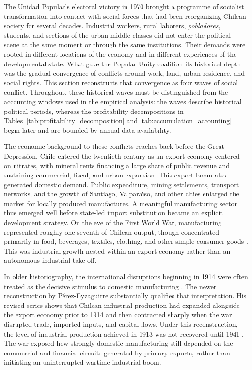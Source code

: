 The Unidad Popular's electoral victory in 1970 brought a programme of socialist transformation into contact with social forces that had been reorganizing Chilean society for several decades. Industrial workers, rural laborers, \emph{pobladores}, students, and sections of the urban middle classes did not enter the political scene at the same moment or through the same institutions. Their demands were rooted in different locations of the economy and in different experiences of the developmental state. What gave the Popular Unity coalition its historical depth was the gradual convergence of conflicts around work, land, urban residence, and social rights. This section reconstructs that convergence as four waves of social conflict. Throughout, these historical waves must be distinguished from the accounting windows used in the empirical analysis: the waves describe historical political periods, whereas the profitability decompositions in Tables~\ref{tab:profitability_decomposition} and \ref{tab:accumulation_accounting} begin later and are bounded by annual data availability.

The economic background to these conflicts reaches back before the Great Depression. Chile entered the twentieth century as an export economy centered on nitrates, with mineral rents financing a large share of public revenue and sustaining commercial, fiscal, and urban expansion. This export boom also generated domestic demand. Public expenditure, mining settlements, transport networks, and the growth of Santiago, Valpara\'{\i}so, and other cities enlarged the market for locally produced manufactures. A meaningful manufacturing sector thus emerged well before state-led import substitution became an explicit development strategy. On the eve of the First World War, manufacturing represented roughly one-seventh of Chilean output, though concentrated primarily in food, beverages, textiles, clothing, and other simple consumer goods \citep{BulmerThomas2003}. This was industrial growth nested within an export economy rather than an autonomous industrial take-off.

In older historiography, the international disruptions beginning in 1914 were often treated as the decisive stimulus to domestic manufacturing \citep{Palma1984}. The newer reconstruction by P\'erez-Eyzaguirre substantially qualifies that interpretation. His revised series shows that Chilean industrial production had expanded alongside the export economy prior to 1914 and then contracted sharply when the war disrupted trade, imported inputs, and capital flows. Under this reconstruction, the level of industrial production achieved in 1913 was not recovered until 1941 \citep{PerezEyzaguirre2025}. The war exposed how strongly domestic manufacturing still depended on the commercial and financial circuits generated by primary exports, rather than initiating an uninterrupted wartime industrial boom.

